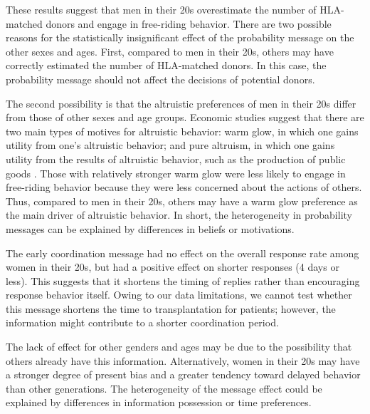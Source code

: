 \documentclass[12pt, a4paper]{article}
\begin{document}
These results suggest that men in their 20s overestimate the number of HLA-matched donors and engage in free-riding behavior. There are two possible reasons for the statistically insignificant effect of the probability message on the other sexes and ages. First, compared to men in their 20s, others may have correctly estimated the number of HLA-matched donors. In this case, the probability message should not affect the decisions of potential donors.

The second possibility is that the altruistic preferences of men in their 20s differ from those of other sexes and age groups. Economic studies suggest that there are two main types of motives for altruistic behavior: warm glow, in which one gains utility from one's altruistic behavior; and pure altruism, in which one gains utility from the results of altruistic behavior, such as the production of public goods \citep{Andreoni1990}. Those with relatively stronger warm glow were less likely to engage in free-riding behavior because they were less concerned about the actions of others. Thus, compared to men in their 20s, others may have a warm glow preference as the main driver of altruistic behavior. In short, the heterogeneity in probability messages can be explained by differences in beliefs or motivations.

The early coordination message had no effect on the overall response rate among women in their 20s, but had a positive effect on shorter responses (4 days or less). This suggests that it shortens the timing of replies rather than encouraging response behavior itself. Owing to our data limitations, we cannot test whether this message shortens the time to transplantation for patients; however, the information might contribute to a shorter coordination period.

The lack of effect for other genders and ages may be due to the possibility that others already have this information. Alternatively, women in their 20s may have a stronger degree of present bias and a greater tendency toward delayed behavior than other generations. The heterogeneity of the message effect could be explained by differences in information possession or time preferences.
\end{document}
